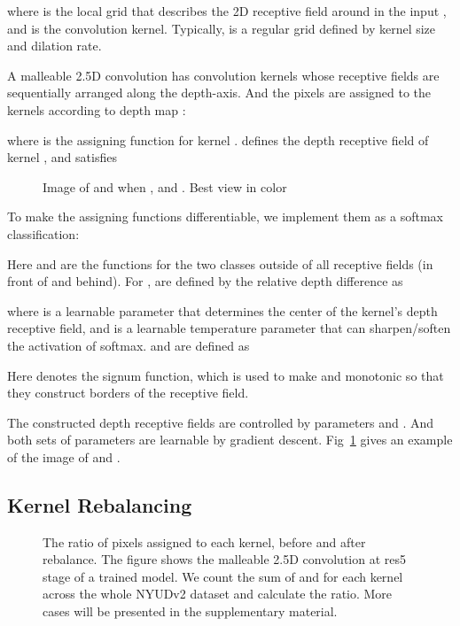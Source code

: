 \documentclass[runningheads]{llncs}
\begin{document}
where  is the local grid that describes the 2D receptive field around  in the input , and  is the convolution kernel.
Typically,  is a regular grid defined by kernel size and dilation rate.

A malleable 2.5D convolution has  convolution kernels whose receptive fields are sequentially arranged along the depth-axis.
And the pixels are assigned to the kernels according to depth map :

where  is the assigning function for kernel .
 defines the depth receptive field of kernel , and satisfies


\begin{figure}[tbp]
  \centering
  \caption{
    Image of  and  when ,  and .
    Best view in color
  }
  \label{fig:receptive_field_funcs_eg}
\end{figure}

To make the assigning functions differentiable, we implement them as a softmax classification:

Here  and  are the functions for the two classes outside of all receptive fields (in front of and behind).
For ,  are defined by the relative depth difference as

where  is a learnable parameter that determines the center of the kernel's depth receptive field, and  is a learnable temperature parameter that can sharpen/soften the activation of softmax.
 and  are defined as

Here  denotes the signum function, which is used to make  and  monotonic so that they construct borders of the receptive field.

The constructed depth receptive fields are controlled by parameters  and .
And both sets of parameters are learnable by gradient descent.
Fig~\ref{fig:receptive_field_funcs_eg} gives an example of the image of  and .


\subsection{Kernel Rebalancing}

\begin{figure}[htbp]
  \centering
  \caption{
    The ratio of pixels assigned to each kernel, before and after rebalance.
    The figure shows the malleable 2.5D convolution at res5 stage of a trained model.
    We count the sum of  and  for each kernel across the whole NYUDv2 dataset and calculate the ratio.
    More cases will be presented in the supplementary material.
  }
  \label{fig:rebalance}
\end{figure}
\end{document}
